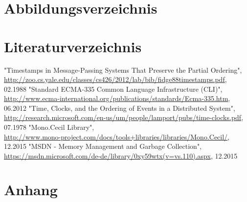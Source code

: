 \documentclass[10pt,a4paper]{article}
\begin{document}
\section*{Abbildungsverzeichnis}
\makeatletter
{}
\makeatother
\section*{Literaturverzeichnis}
\newcommand\oldsection{}
\let\oldsection=\section
\renewcommand{\section}[2]{}
\begin{thebibliography}{xxxxxxxxxxxxx}
"Timestamps in Message-Passing Systems That Preserve the Partial Ordering", \href{http://zoo.cs.yale.edu/classes/cs426/2012/lab/bib/fidge88timestamps.pdf}{http://zoo.cs.yale.edu/classes/cs426/2012/lab/bib/fidge88timestamps.pdf}, 02.1988
"Standard ECMA-335 Common Language Infrastructure (CLI)", \href{http://www.ecma-international.org/publications/standards/Ecma-335.htm}{http://www.ecma-international.org/publications/standards/Ecma-335.htm}, 06.2012
"Time, Clocks, and the Ordering of Events in a Distributed System", \href{http://research.microsoft.com/en-us/um/people/lamport/pubs/time-clocks.pdf}{http://research.microsoft.com/en-us/um/people/lamport/pubs/time-clocks.pdf}, 07.1978
"Mono.Cecil Library",\\ \href{http://www.mono-project.com/docs/tools+libraries/libraries/Mono.Cecil/}{http://www.mono-project.com/docs/tools+libraries/libraries/Mono.Cecil/}, 12.2015
"MSDN - Memory Management and Garbage Collection", \href{https://msdn.microsoft.com/de-de/library/0xy59wtx(v=vs.110).aspx}{https://msdn.microsoft.com/de-de/library/0xy59wtx(v=vs.110).aspx}, 12.2015
\end{thebibliography}
\let\section=\oldsection
\section*{Anhang}
\end{document}
